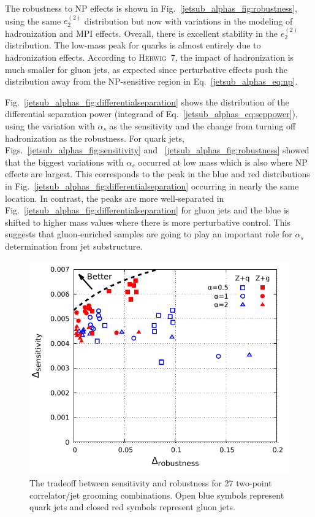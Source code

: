 \documentclass[11pt]{cernrep}
\begin{document}
The robustness to NP effects is shown in Fig.~\ref{jetsub_alphas_fig:robustness}, using the same $e_2^{(2)}$ distribution but now with variations in the modeling of hadronization and MPI effects.
%
Overall, there is excellent stability in the $e_2^{(2)}$ distribution.
%
The low-mass peak for quarks is almost entirely due to hadronization effects.
%
According to \textsc{Herwig~7}, the impact of hadronization is much smaller for gluon jets, as expected since perturbative effects push the distribution away from the NP-sensitive region in Eq.~\ref{jetsub_alphas_eq:np}.

Fig.~\ref{jetsub_alphas_fig:differentialseparation} shows the distribution of the differential separation power (integrand of Eq.~\ref{jetsub_alphas_eq:seppower}), using the variation with $\alpha_s$ as the sensitivity and the change from turning off hadronization as the robustness.
%
For quark jets, Figs.~\ref{jetsub_alphas_fig:sensitivity} and ~\ref{jetsub_alphas_fig:robustness} showed that the biggest variations with $\alpha_s$ occurred at low mass which is also where NP effects are largest.
%
This corresponds to the peak in the blue and red distributions in Fig.~\ref{jetsub_alphas_fig:differentialseparation} occurring in nearly the same location.
%
In contrast, the peaks are more well-separated in Fig.~\ref{jetsub_alphas_fig:differentialseparation} for gluon jets and the blue is shifted to higher mass values where there is more perturbative control.
%
This suggests that gluon-enriched samples are going to play an important role for $\alpha_s$ determination from jet substructure.

\begin{figure}[t]
\begin{center}
\includegraphics[width = 0.6\columnwidth]{jetsub_alphas_robsep.pdf}
\end{center}
\caption{The tradeoff between sensitivity and robustness for 27 two-point correlator/jet grooming combinations.  Open blue symbols represent quark jets and closed red symbols represent gluon jets.}
\label{jetsub_alphas_fig:robseptradeoff}
\end{figure}
\end{document}
